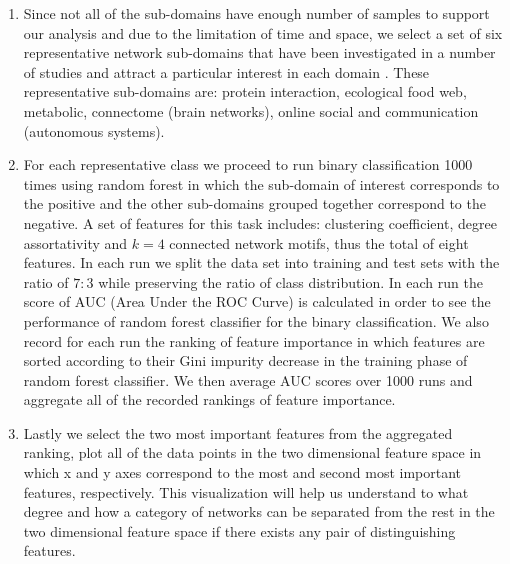 \documentclass{article}
\begin{document}
\begin{enumerate}
	\item Since not all of the sub-domains have enough number of samples to support our analysis and due to the limitation of time and space, we select a set of six representative network sub-domains that have been investigated in a number of studies and attract a particular interest in each domain . These representative sub-domains are: protein interaction, ecological food web, metabolic, connectome (brain networks),  online social and communication (autonomous systems). \item For each representative class we proceed to run binary classification 1000 times using random forest in which the sub-domain of interest corresponds to the positive and the other sub-domains grouped together correspond to the negative.  A set of features for this task includes: clustering coefficient, degree assortativity and $k = 4$ connected network motifs, thus the total of eight features. In each run we split the data set into training and test sets with the ratio of $7:3$ while preserving the ratio of class distribution. In each run the score of AUC (Area Under the ROC Curve) is calculated in order to see the performance of random forest classifier for the binary classification. We also record for each run the ranking of feature importance in which features are sorted according to their Gini impurity decrease in the training phase of random forest classifier. We then average AUC scores over 1000 runs and aggregate all of the recorded rankings of feature importance.
	\item Lastly we select the two most important features from the aggregated ranking, plot all of the data points in the two dimensional feature space in which x and y axes correspond to the most and second most important features, respectively. This visualization will help us understand to what degree and how a category of networks can be separated from the rest in the two dimensional feature space if there exists any pair of distinguishing features.
\end{enumerate}
\end{document}
